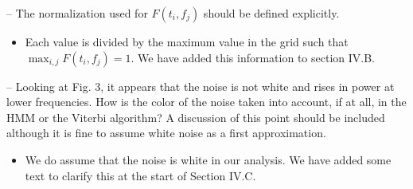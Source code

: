 \documentclass{article}
\begin{document}
\noindent
-- The normalization used for $F(t_i, f_j)$ should be defined explicitly. 
\begin{itemize}
\item Each value is divided by the maximum value in the grid such that $\max_{i,j} F(t_i, f_j) = 1$. We have added this information to section IV.B.
\end{itemize}

\noindent
-- Looking at Fig. 3, it appears that the noise is not white and rises in power at lower frequencies. How is the color of the noise taken into account, if at all, in the HMM or the Viterbi algorithm? A discussion of this point should be included although it is fine to assume white noise as a first approximation. 
\begin{itemize}
\item We do assume that the noise is white in our analysis. We have added some text to clarify this at the start of Section IV.C.
\end{itemize}
\end{document}
